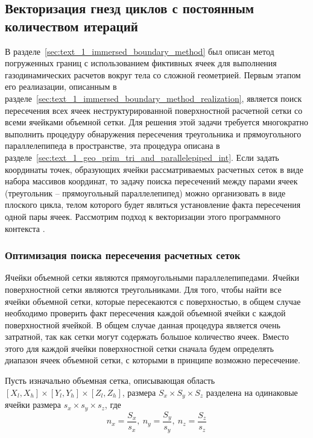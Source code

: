 \subsection{Векторизация гнезд циклов с постоянным количеством итераций}

В разделе~\ref{sec:text_1_immersed_boundary_method} был описан метод погруженных границ с использованием фиктивных ячеек для выполнения газодинамических расчетов вокруг тела со сложной геометрией.
Первым этапом его реалиазации, описанным в разделе~\ref{sec:text_1_immersed_boundary_method_realization}, является поиск пересечения всех ячеек неструктурированной поверхностной расчетной сетки со всеми ячейками объемной сетки.
Для решения этой задачи требуется многократно выполнить процедуру обнаружения пересечения треугольника и прямоугольного параллелепипеда в пространстве, эта процедура описана в разделе~\ref{sec:text_1_geo_prim_tri_and_parallelepiped_int}.
Если задать координаты точек, образующих ячейки рассматриваемых расчетных сеток в виде набора массивов координат, то задачу поиска пересечений между парами ячеек (треугольник -- прямоугольный параллелепипед) можно организовать в виде плоского цикла, телом которого будет являться установление факта пересечения одной пары ячеек.
Рассмотрим подход к векторизации этого программного контекста \cite{Rybakov2019VecInt}.

\subsubsection{Оптимизация поиска пересечения расчетных сеток}

Ячейки объемной сетки являются прямоугольными параллелепипедами.
Ячейки поверхностной сетки являются треугольниками.
Для того, чтобы найти все ячейки объемной сетки, которые пересекаются с поверхностью, в общем случае необходимо проверить факт пересечения каждой объемной ячейки с каждой поверхностной ячейкой.
В общем случае данная процедура является очень затратной, так как сетки могут содержать большое количество ячеек.
Вместо этого для каждой ячейки поверхностной сетки сначала будем определять диапазон ячеек объемной сетки, с которыми в принципе возможно пересечение.

Пусть изначально объемная сетка, описывающая область $[X_l, X_h] \times [Y_l, Y_h] \times [Z_l, Z_h]$, размера $S_x \times S_y \times S_z$ разделена на одинаковые ячейки размера $s_x \times s_y \times s_z$, где
\begin{equation}
	n_x = \frac{S_x}{s_x}, \ n_y = \frac{S_y}{s_y}, \ n_z = \frac{S_z}{s_z}
\end{equation}

